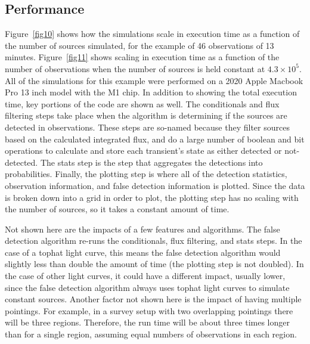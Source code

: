 \documentclass[12pt]{article}
\begin{document}
\subsection{Performance}\label{performance}
Figure~\ref{fig10} shows how the simulations scale in execution time as a function of the number of sources simulated, for the example of 46 observations of 13 minutes. Figure~\ref{fig11} shows scaling in execution time as a function of the number of observations when the number of sources is held constant at $4.3\times10^{5}$.  All of the simulations for this example were performed on a 2020 Apple Macbook Pro 13 inch model with the M1 chip. In addition to showing the total execution time, key portions of the code are shown as well. The conditionals and flux filtering steps take place when the algorithm is determining if the sources are detected in observations. These steps are so-named because they filter sources based on the calculated integrated flux, and do a large number of boolean and bit operations to calculate and store each transient's state as either detected or not-detected. The stats step is the step that aggregates the detections into probabilities. Finally, the plotting step is where all of the detection statistics, observation information, and false detection information is plotted. Since the data is broken down into a grid in order to plot, the plotting step has no scaling with the number of sources, so it takes a constant amount of time. 

Not shown here are the impacts of a few features and algorithms. The false detection algorithm re-runs the conditionals, flux filtering, and stats steps. In the case of a tophat light curve, this means the false detection algorithm would slightly less than double the amount of time (the plotting step is not doubled). In the case of other light curves, it could have a different impact, usually lower, since the false detection algorithm always uses tophat light curves to simulate constant sources. Another factor not shown here is the impact of having multiple pointings. For example, in a survey setup with two overlapping pointings there will be three regions. Therefore, the run time will be about three times longer than for a single region, assuming equal numbers of observations in each region. 
\end{document}
